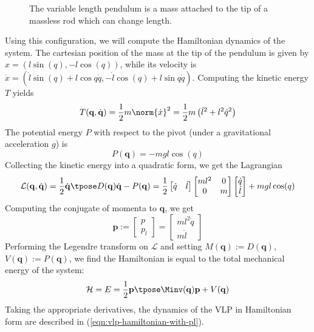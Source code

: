 \begin{figure}
   \centering
   
   \caption{The variable length pendulum is a mass attached to the
      tip of a massless rod which can change length.}\label{fig:vlp-model}
\end{figure}

Using this configuration, we will compute the Hamiltonian dynamics of the system.
The cartesian position of the mass at the tip of the pendulum
is given by \(x = (l\sin(q),-l\cos(q))\), while its velocity is
\(\dot{x} = (\dot{l}\sin(q) + l\cos{q}\dot{q}, -\dot{l}\cos(q) + l\sin{q}\dot{q})\).
Computing the kinetic energy \(T\) yields
\[
   T(\mathbf{q},\dot{\mathbf{q}}) = 
   \frac{1}{2}m\norm{\dot{x}}^2 = \frac{1}{2}m\left(\dot{l}^2 + l^2\dot{q}^2\right)
\]
The potential energy \(P\) with respect to the pivot (under a gravitational
acceleration \(g\)) is
\[
   P(\mathbf{q}) = -mgl\cos(q)
\]
Collecting the kinetic energy into a quadratic form, we get the Lagrangian
\[
   \mathcal{L}(\mathbf{q},\dot{\mathbf{q}}) 
   = \frac{1}{2} \dot{\mathbf{q}}\tpose D(\mathbf{q})\dot{\mathbf{q}} - P(\mathbf{q})
   = \frac{1}{2}
   \begin{bmatrix} \dot{q} & \dot{l} \end{bmatrix}
   \begin{bmatrix}
      ml^2 & 0 \\
      0 & m \\
   \end{bmatrix}
   \begin{bmatrix} 
      \dot{q} \\ \dot{l}
   \end{bmatrix}
   + mgl\cos(q)
\]
Computing the conjugate of momenta to \(\mathbf{q}\), we get 
\[
   \mathbf{p} := \begin{bmatrix} p \\ p_l \end{bmatrix} 
   = \begin{bmatrix} ml^2\dot{q} \\ m\dot{l} \end{bmatrix} 
\]
Performing the Legendre transform on \(\mathcal{L}\) and setting
\(M(\mathbf{q}) := D(\mathbf{q})\), \(V(\mathbf{q}) := P(\mathbf{q})\),
we find the Hamiltonian is equal to the total mechanical energy of the system:
\[
   \mathcal{H} = E = \frac{1}{2}\mathbf{p}\tpose \Minv(\mathbf{q})
   \mathbf{p}+V(\mathbf{q})
\]
Taking the appropriate derivatives, the dynamics of the VLP in Hamiltonian form
are described in (\ref{eqn:vlp-hamiltonian-with-pl}). 
